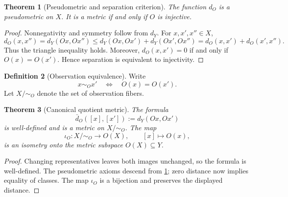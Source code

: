 \documentclass[11pt,a4paper]{article}
\theoremstyle{definition}
\newtheorem{definition}{Definition}[section]
\theoremstyle{plain}
\newtheorem{theorem}[definition]{Theorem}
\theoremstyle{remark}
\begin{document}
\begin{theorem}[Pseudometric and separation criterion]
\label{thm:pseudometric}
The function $d_O$ is a pseudometric on $X$. It is a metric if and only if
$O$ is injective.
\end{theorem}

\begin{proof}
Nonnegativity and symmetry follow from $d_Y$. For $x,x',x''\in X$,
\[
d_O(x,x'')
=d_Y(Ox,Ox'')
\leq d_Y(Ox,Ox')+d_Y(Ox',Ox'')
=d_O(x,x')+d_O(x',x'').
\]
Thus the triangle inequality holds. Moreover,
$d_O(x,x')=0$ if and only if $O(x)=O(x')$. Hence separation is equivalent
to injectivity.
\end{proof}

\begin{definition}[Observation equivalence]
Write
\[
 x\sim_O x'
 \quad\Longleftrightarrow\quad
 O(x)=O(x').
\]
Let $X/{\sim_O}$ denote the set of observation fibers.
\end{definition}

\begin{theorem}[Canonical quotient metric]
\label{thm:quotient}
The formula
\[
 \bar d_O([x],[x']):=d_Y(Ox,Ox')
\]
is well-defined and is a metric on $X/{\sim_O}$. The map
\[
 \iota_O:X/{\sim_O}\longrightarrow O(X),\qquad [x]\longmapsto O(x),
\]
is an isometry onto the metric subspace $O(X)\subseteq Y$.
\end{theorem}

\begin{proof}
Changing representatives leaves both images unchanged, so the formula is
well-defined. The pseudometric axioms descend from
\cref{thm:pseudometric}; zero distance now implies equality of classes.
The map $\iota_O$ is a bijection and preserves the displayed distance.
\end{proof}

\begin{center}
\end{center}
\end{document}

